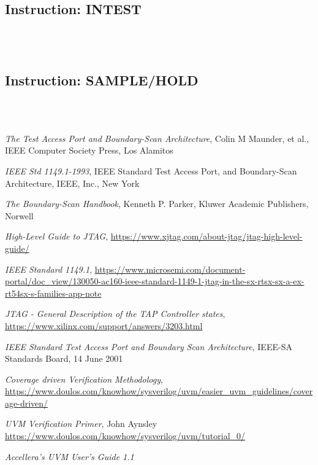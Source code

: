 \documentclass[a4paper,11pt]{article}
\begin{document}
\subsection{Instruction: INTEST}
\ \\
\ \\

\subsection{Instruction: SAMPLE/HOLD}
\ \\
\ \\


\newpage
\pagebreak
%
\newpage

\begin{thebibliography}{i}
 {\em The Test Access Port and Boundary-Scan Architecture}, Colin M Maunder, et al., IEEE Computer Society Press, Los Alamitos

 {\em IEEE Std 1149.1-1993}, IEEE Standard Test Access Port, and Boundary-Scan Architecture, IEEE, Inc., New York

 {\em The Boundary-Scan Handbook}, Kenneth P. Parker, Kluwer Academic Publishers, Norwell

 {\em High-Level Guide to JTAG},
\url{https://www.xjtag.com/about-jtag/jtag-high-level-guide/}

 {\em IEEE Standard 1149.1},
\url{https://www.microsemi.com/document-portal/doc_view/130050-ac160-ieee-standard-1149-1-jtag-in-the-sx-rtsx-sx-a-ex-rt54sx-s-families-app-note}

 {\em JTAG - General Description of the TAP Controller states},
\url{https://www.xilinx.com/support/answers/3203.html}

 {\em IEEE Standard Test Access Port and Boundary Scan Architecture}, IEEE-SA Standards Board, 14 June 2001

 {\em Coverage driven Verification Methodology},
\url{https://www.doulos.com/knowhow/sysverilog/uvm/easier_uvm_guidelines/coverage-driven/}

 {\em UVM Verification Primer}, John Aynsley
\url{https://www.doulos.com/knowhow/sysverilog/uvm/tutorial_0/}

 {\em Accellera's UVM User's Guide 1.1}


\end{thebibliography}
\end{document}
